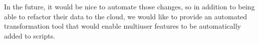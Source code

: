 \documentclass{sigplanconf}
\begin{document}
In the future, it would be nice to automate those changes, so in addition to being able to refactor their data to the cloud, we would like to provide an automated transformation tool that would enable multiuser features to be automatically added to scripts.









\end{document}
